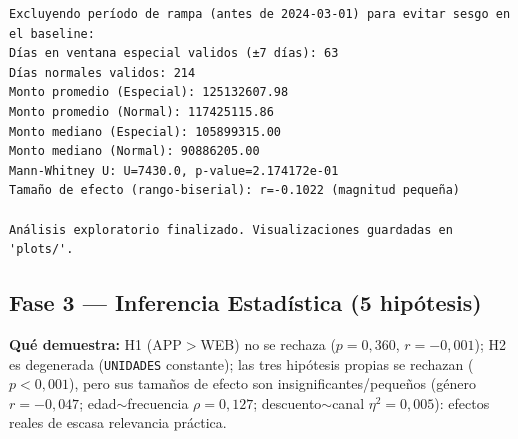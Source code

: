 \documentclass[12pt,letterpaper]{article}
\begin{document}
\begin{Verbatim}[breaklines=true,breakanywhere=true,fontsize=\scriptsize,breaksymbolleft={\tiny\ensuremath{\hookrightarrow}}]
Excluyendo período de rampa (antes de 2024-03-01) para evitar sesgo en el baseline:
Días en ventana especial validos (±7 días): 63
Días normales validos: 214
Monto promedio (Especial): 125132607.98
Monto promedio (Normal): 117425115.86
Monto mediano (Especial): 105899315.00
Monto mediano (Normal): 90886205.00
Mann-Whitney U: U=7430.0, p-value=2.174172e-01
Tamaño de efecto (rango-biserial): r=-0.1022 (magnitud pequeña)

Análisis exploratorio finalizado. Visualizaciones guardadas en 'plots/'.
\end{Verbatim}


\subsection*{Fase 3 --- Inferencia Estadística (5 hipótesis)}
\textbf{Qué demuestra:} H1 (APP$>$WEB) no se rechaza ($p=0{,}360$, $r=-0{,}001$); H2 es degenerada
(\texttt{UNIDADES} constante); las tres hipótesis propias se rechazan ($p<0{,}001$), pero sus
tamaños de efecto son insignificantes/pequeños (género $r=-0{,}047$; edad$\sim$frecuencia
$\rho=0{,}127$; descuento$\sim$canal $\eta^2=0{,}005$): efectos reales de escasa relevancia práctica.
\end{document}
